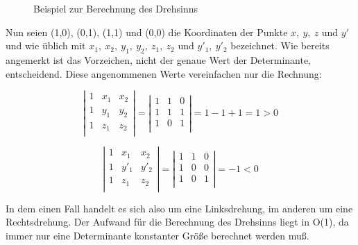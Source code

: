 \documentclass{scrreprt}%
\theoremstyle{break}
\begin{document}
\begin{figure}[H]
\begin{center}

\end{center}
\caption{Beispiel zur Berechnung des Drehsinns}
\label{drehsinnskizze}
\end{figure}

Nun seien (1,0), (0,1), (1,1) und (0,0) die Koordinaten der Punkte $x,\ y,\ z \mbox{ und }y'$ 
und wie üblich mit $x_1,\  x_2,\ y_1,\ y_2,\ z_1,\ z_2 \mbox{ und } y'_1,\ y'_2$
bezeichnet. Wie bereits angemerkt ist das Vorzeichen, nicht der genaue Wert der
Determinante, entscheidend. Diese angenommen\-en Werte vereinfachen nur die Rechnung:

\[ \left| 
\begin{array}{ccc}
1 & x_1 & x_2\\
1 & y_1 & y_2\\
1 & z_1 & z_2\\
\end{array} 
\right|=
\left| 
\begin{array}{ccc}
1 & 1 & 0\\
1 & 1 & 1\\
1 & 0 & 1\\
\end{array} 
\right|=1-1+1=1>0 \]

\[ \left| 
\begin{array}{ccc}
1 & x_1 & x_2\\
1 & y'_1 & y'_2\\
1 & z_1 & z_2\\
\end{array} 
\right|=
\left| 
\begin{array}{ccc}
1 & 1 & 0\\
1 & 0 & 0\\
1 & 0 & 1\\
\end{array} 
\right|=-1<0 \]

In dem einen Fall handelt es sich also um eine Linksdrehung, im anderen um eine Rechtsdrehung. Der Aufwand für die Berechnung des
Drehsinns liegt in O(1), da immer nur eine Determinante konstanter Größe berechnet werden muß.
\end{document}
